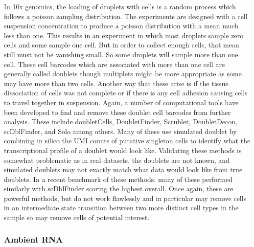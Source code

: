 \par{
In 10x genomics, the loading of droplets with cells is a random process which follows a poisson sampling distribution. The experiments are designed with a cell suspension concentration to produce a poisson distribution with a mean much less than one. This results in an experiment in which most droplets sample zero cells and some sample one cell. But in order to collect enough cells, that mean still must not be vanishing small. So some droplets will sample more than one cell. These cell barcodes which are associated with more than one cell are generally called doublets though multiplets might be more appropriate as some may have more than two cells. Another way that these arise is if the tissue dissociation of cells was not complete or if there is any cell adhesion causing cells to travel together in suspension. Again, a number of computational tools have been developed to find and remove these doublet cell barcodes from further analysis. These include doubletCells\cite{doubletCells}, DoubletFinder\cite{doubletfinder}, Scrublet\cite{scrublet}, DoubletDecon\cite{doubletdecon}, scDblFinder\cite{scDblFinder}, and Solo\cite{solo} among others. Many of these use simulated doublet by combining in silico the UMI counts of putative singleton cells to identify what the transcriptional profile of a doublet would look like. Validating these methods is somewhat problematic as in real datasets, the doublets are not known, and simulated doublets may not exactly match what data would look like from true doublets. In a recent benchmark of these methods, many of these performed similarly with scDblFinder scoring the highest overall\cite{doubletbench}. Once again, these are powerful methods, but do not work flawlessly and in particular may remove cells in an intermediate state transition between two more distinct cell types in the sample so may remove cells of potential interest.
}


\subsubsection{Ambient RNA}

